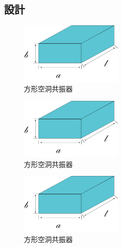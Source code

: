 \subsection{設計}


\vspace{10 mm}

\begin{figure}[h]
  \begin{center}
    \includegraphics[width=5cm]{./image/空洞共振器.png}
    \caption{方形空洞共振器}
    \label{fig:Cavity}
  \end{center}
\end{figure}

\vspace{10 mm}

\begin{figure}[h]
  \begin{center}
    \includegraphics[width=5cm]{./image/空洞共振器.png}
    \caption{方形空洞共振器}
    \label{fig:Cavity}
  \end{center}
\end{figure}

\vspace{10 mm}

\begin{figure}[h]
  \begin{center}
    \includegraphics[width=5cm]{./image/空洞共振器.png}
    \caption{方形空洞共振器}
    \label{fig:Cavity}
  \end{center}
\end{figure}

